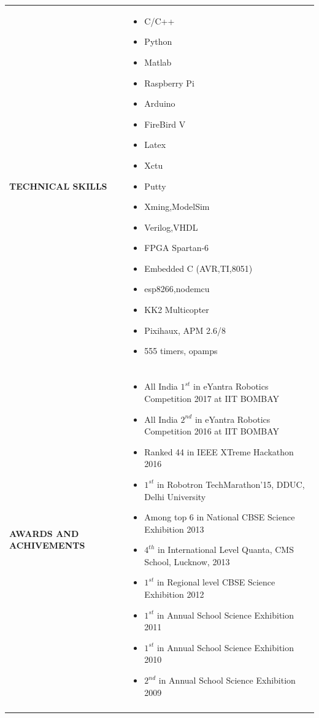 \documentclass[a4paper]{article}
\begin{document}
\begin{longtable}{@{}m{3.0cm}m{14cm}@{}}
			
			\textrm{\textbf {TECHNICAL SKILLS}} & 
				\begin{itemize}
					\itemsep -2pt
					\item
					C/C++
					\item
					Python
					\item
					Matlab
					\item
					Raspberry Pi
					\item
					Arduino
					\item
					FireBird V
					\item
					Latex
					\item
					Xctu
					\item
					Putty
					\item
					Xming,ModelSim
					\item
					Verilog,VHDL
					\item
					FPGA Spartan-6
					\item
					Embedded C (AVR,TI,8051)
					\item
					esp8266,nodemcu
					\item
					KK2 Multicopter
					\item
					Pixihaux, APM 2.6/8
					\item
					555 timers, opamps
				\end{itemize}
			\\ \\
			
			
			\textrm{\textbf {AWARDS AND \newline ACHIVEMENTS}} & 
				\begin{itemize}
					\itemsep -2pt
					\item
					 All India $1^{st}$ in eYantra Robotics Competition 2017 at IIT BOMBAY
					\item
					All India $2^{nd}$ in eYantra Robotics Competition 2016 at IIT BOMBAY
					\item
					Ranked 44 in IEEE XTreme Hackathon 2016
					\item
					$1^{st}$ in Robotron TechMarathon'15, DDUC, Delhi University
					\item
					Among top 6 in National CBSE Science Exhibition 2013
					\item
					$4^{th}$ in International Level Quanta, CMS School, Lucknow, 2013
					\item
					$1^{st}$ in Regional level CBSE Science Exhibition 2012
					\item
					$1^{st}$ in Annual School Science Exhibition 2011
					\item
					$1^{st}$ in Annual School Science Exhibition 2010
					\item
					$2^{nd}$ in Annual School Science Exhibition 2009
				\end{itemize}
			\\ \\
			

\end{longtable}
\end{document}
